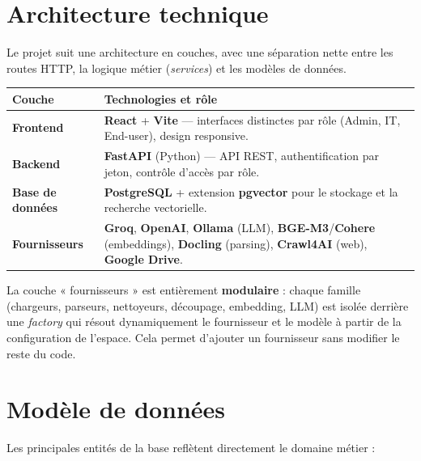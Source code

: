 \documentclass[11pt,a4paper]{article}
\begin{document}
\section{Architecture technique}

Le projet suit une architecture en couches, avec une séparation nette entre les
routes HTTP, la logique métier (\emph{services}) et les modèles de données.

\begin{center}
\renewcommand{\arraystretch}{1.25}
\begin{tabularx}{\linewidth}{@{}>{\bfseries\color{ink}}l X@{}}
  \toprule
  Couche & Technologies et rôle \\
  \midrule
  Frontend & \textbf{React} + \textbf{Vite} — interfaces distinctes par rôle
             (Admin, IT, End-user), design responsive. \\
  Backend  & \textbf{FastAPI} (Python) — API REST, authentification par jeton,
             contrôle d'accès par rôle. \\
  Base de données & \textbf{PostgreSQL} + extension \textbf{pgvector} pour le
             stockage et la recherche vectorielle. \\
  Fournisseurs & \textbf{Groq}, \textbf{OpenAI}, \textbf{Ollama} (LLM),
             \textbf{BGE-M3}/\textbf{Cohere} (embeddings), \textbf{Docling}
             (parsing), \textbf{Crawl4AI} (web), \textbf{Google Drive}. \\
  \bottomrule
\end{tabularx}
\end{center}

La couche « fournisseurs » est entièrement \textbf{modulaire} : chaque famille
(chargeurs, parseurs, nettoyeurs, découpage, embedding, LLM) est isolée derrière
une \emph{factory} qui résout dynamiquement le fournisseur et le modèle à partir
de la configuration de l'espace. Cela permet d'ajouter un fournisseur sans
modifier le reste du code.

\section{Modèle de données}

Les principales entités de la base reflètent directement le domaine métier :
\end{document}
